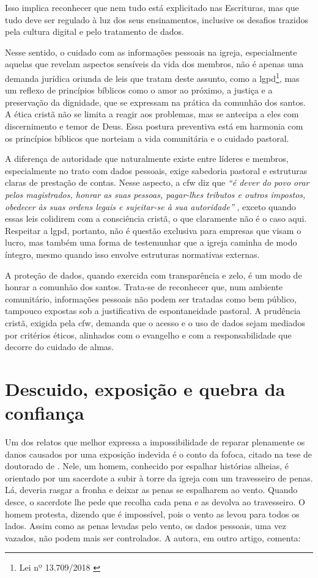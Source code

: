 Isso implica reconhecer que nem tudo está explicitado nas Escrituras, mas que tudo deve ser regulado à luz dos seus ensinamentos, inclusive os desafios trazidos pela cultura digital e pelo tratamento de dados.

Nesse sentido, o cuidado com as informações pessoais na igreja, especialmente aquelas que revelam aspectos sensíveis da vida dos membros, não é apenas uma demanda jurídica oriunda de leis que tratam deste assunto, como a \gls{lgpd}\footnote{Lei nº 13.709/2018 \cite{lgpd2018}}, mas um reflexo de princípios bíblicos como o amor ao próximo, a justiça e a preservação da dignidade, que se expressam na prática da comunhão dos santos. A ética cristã não se limita a reagir aos problemas, mas se antecipa a eles com discernimento e temor de Deus. Essa postura preventiva está em harmonia com os princípios bíblicos que norteiam a vida comunitária e o cuidado pastoral.

A diferença de autoridade que naturalmente existe entre líderes e membros, especialmente no trato com dados pessoais, exige sabedoria pastoral e estruturas claras de prestação de contas. Nesse aspecto, a \gls{cfw} diz que \textit{``é dever do povo orar pelos magistrados, honrar as suas pessoas, pagar-lhes tributos e outros impostos, obedecer às suas ordens legais e sujeitar-se à sua autoridade''} \cite[Cap.~XXIII]{cfw}, exceto quando essas leis colidirem com a consciência cristã, o que claramente não é o caso aqui. Respeitar a \gls{lgpd}, portanto, não é questão exclusiva para empresas que visam o lucro, mas também uma forma de testemunhar que a igreja caminha de modo íntegro, mesmo quando isso envolve estruturas normativas externas.

A proteção de dados, quando exercida com transparência e zelo, é um modo de honrar a comunhão dos santos. Trata-se de reconhecer que, num ambiente comunitário, informações pessoais não podem ser tratadas como bem público, tampouco expostas sob a justificativa de espontaneidade pastoral. A prudência cristã, exigida pela \gls{cfw}, demanda que o acesso e o uso de dados sejam mediados por critérios éticos, alinhados com o evangelho e com a responsabilidade que decorre do cuidado de almas.

\section{Descuido, exposição e quebra da confiança}

Um dos relatos que melhor expressa a impossibilidade de reparar plenamente os danos causados por uma exposição indevida é o conto da fofoca, citado na tese de doutorado de . Nele, um homem, conhecido por espalhar histórias alheias, é orientado por um sacerdote a subir à torre da igreja com um travesseiro de penas. Lá, deveria rasgar a fronha e deixar as penas se espalharem ao vento. Quando desce, o sacerdote lhe pede que recolha cada pena e as devolva ao travesseiro. O homem protesta, dizendo que é impossível, pois o vento as levou para todos os lados. Assim como as penas levadas pelo vento, os dados pessoais, uma vez vazados, não podem mais ser controlados. A autora, em outro artigo, comenta:

